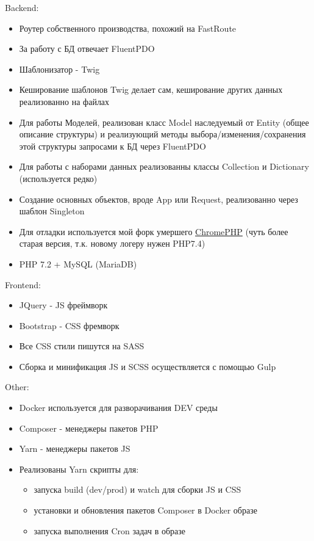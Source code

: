 \documentclass[10pt]{tpl/developercv} %
\begin{document}
Backend:
\begin{itemize}
  \item Роутер собственного производства, похожий на FastRoute
  \item За работу с БД отвечает FluentPDO
  \item Шаблонизатор - Twig
  \item Кеширование шаблонов Twig делает сам, кеширование других данных реализованно на файлах
  \item Для работы Моделей, реализован класс Model наследуемый от Entity (общее описание структуры) и реализующий методы выбора/изменения/сохранения этой структуры запросами к БД через FluentPDO
  \item Для работы с наборами данных реализованны классы Collection и Dictionary (используется редко)
  \item Создание основных объектов, вроде App или Request, реализованно через шаблон Singleton
  \item Для отладки используется мой форк умершего \href{https://github.com/rame0/chromephp}{ChromePHP} (чуть более старая версия, т.к. новому логеру нужен PHP7.4)
  \item PHP 7.2 + MySQL (MariaDB)
\end{itemize}

Frontend:
\begin{itemize}
  \item JQuery - JS фреймворк
  \item Bootstrap - CSS фремворк
  \item Все CSS стили пишутся на SASS
  \item Сборка и минификация JS и SCSS осуществляется с помощью Gulp
\end{itemize}

Other:
\begin{itemize}
  \item Docker используется для разворачивания DEV среды
  \item Composer - менеджеры пакетов PHP
  \item Yarn - менеджеры пакетов JS
  \item Реализованы Yarn скрипты для:
  \begin{itemize}
    \item запуска build (dev/prod) и watch для сборки JS и CSS
    \item установки и обновления пакетов Composer в Docker образе
    \item запуска выполнения Cron задач в образе
  \end{itemize}
\end{itemize}
\end{document}
